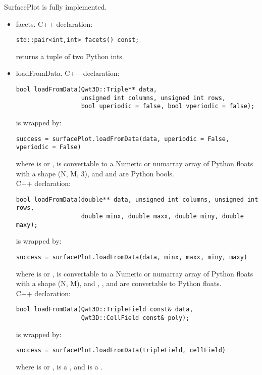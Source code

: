 \documentclass{manual}
\begin{document}
\begin{classdesc*}{SurfacePlot}
  is fully implemented.
  \begin{itemize}
  \item{facets}. C++ declaration:
\begin{verbatim}
std::pair<int,int> facets() const;
\end{verbatim}
    returns a tuple of two Python ints.
  \item{loadFromData}. C++ declaration:
\begin{verbatim}
bool loadFromData(Qwt3D::Triple** data,
                  unsigned int columns, unsigned int rows,
                  bool uperiodic = false, bool vperiodic = false);
\end{verbatim}
    is wrapped by:
\begin{verbatim}
success = surfacePlot.loadFromData(data, uperiodic = False, vperiodic = False)
\end{verbatim}
    where  is  or , 
    is convertable to a Numeric or numarray array of Python floats with a shape
    (N, M, 3), and  and  are Python bools.\\
    C++ declaration:
\begin{verbatim}
bool loadFromData(double** data, unsigned int columns, unsigned int rows,
                  double minx, double maxx, double miny, double maxy);
\end{verbatim}
    is wrapped by:
\begin{verbatim}
success = surfacePlot.loadFromData(data, minx, maxx, miny, maxy)
\end{verbatim}
    where  is  or , 
    is convertable to a Numeric or numarray array of Python floats with a shape
    (N, M), and , ,  and  are
    convertable to Python floats.\\
    C++ declaration:
\begin{verbatim}
bool loadFromData(Qwt3D::TripleField const& data,
                  Qwt3D::CellField const& poly);
\end{verbatim}
    is wrapped by:
\begin{verbatim}
success = surfacePlot.loadFromData(tripleField, cellField)
\end{verbatim}
    where  is  or ,
     is a , and  is a
    .

\end{itemize}
\end{classdesc*}
\end{document}
